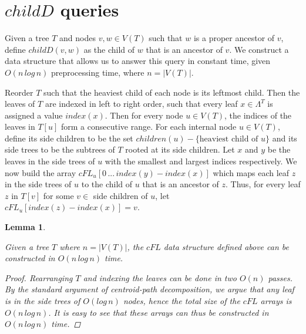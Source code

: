 \documentclass{article}
\newcommand{\leafset}{\Lambda}
\newtheorem{cfddatastructure}[incompatibility]{Lemma}
\begin{document}
    \section{$childD$ queries}
    \label{sec:cfd}

    Given a tree $T$ and nodes $v, w \in V(T)$ such that $w$ is a proper ancestor of $v$, define $childD(v, w)$ as the child of $w$ that is an ancestor of $v$. We construct a data structure that allows us to answer this query in constant time, given $O(n\,log\,n)$ preprocessing time, where $n = |V(T)|$.

    Reorder $T$ such that the heaviest child of each node is its leftmost child. Then the leaves of $T$ are indexed in left to right order, such that every leaf $x \in \leafset^T$ is assigned a value $index(x)$. Then for every node $u \in V(T)$, the indices of the leaves in $T[u]$ form a consecutive range. For each internal node $u \in V(T)$, define its side children to be the set $children(u) - \{\text{heaviest child of }u\}$ and its side trees to be the subtrees of $T$ rooted at its side children. Let $x$ and $y$ be the leaves in the side trees of $u$ with the smallest and largest indices respectively. We now build the array $cFL_u[0\, ...\, index(y) - index(x)]$ which maps each leaf $z$ in the side trees of $u$ to the child of $u$ that is an ancestor of $z$. Thus, for every leaf $z$ in $T[v]$ for some $v \in$ side children of $u$, let $cFL_u[index(z) - index(x)] = v$.
    \newline

    \begin{cfddatastructure}
        \label{lem:cfddatastructure}

        Given a tree $T$ where $n = |V(T)|$, the $cFL$ data structure defined above can be constructed in $O(n\,log\,n)$ time.

        \begin{proof}
            Rearranging $T$ and indexing the leaves can be done in two $O(n)$ passes. By the standard argument of centroid-path decomposition, we argue that any leaf is in the side trees of $O(log\,n)$ nodes, hence the total size of the $cFL$ arrays is $O(n\,log\,n)$. It is easy to see that these arrays can thus be constructed in $O(n\,log\,n)$ time.
        \end{proof}
    \end{cfddatastructure}
\end{document}
